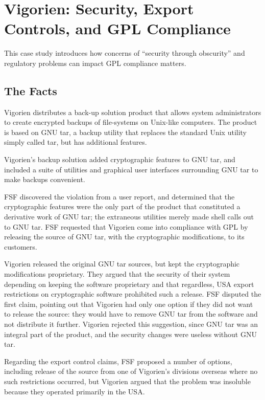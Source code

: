 {\begin{enumerate}
\end{enumerate}


\chapter{Vigorien: Security, Export Controls, and GPL Compliance}

This case study introduces how concerns of ``security through obscurity''
and regulatory problems can impact GPL compliance matters.

\section{The Facts}

Vigorien distributes a back-up solution product that allows system
administrators to create encrypted backups of file-systems on
Unix-like computers. The product is based on GNU tar, a backup utility
that replaces the standard Unix utility simply called tar, but has
additional features.

Vigorien's backup solution added cryptographic features to GNU tar, and
included a suite of utilities and graphical user interfaces surrounding
GNU tar to make backups convenient.

FSF discovered the violation from a user report, and determined that the
cryptographic features were the only part of the product that constituted
a derivative work of GNU tar; the extraneous utilities merely made
shell calls out to GNU tar. FSF requested that Vigorien come into
compliance with GPL by releasing the source of GNU tar, with the
cryptographic modifications, to its customers.

Vigorien released the original GNU tar sources, but kept the cryptographic
modifications proprietary. They argued that the security of their system
depending on keeping the software proprietary and that regardless, USA
export restrictions on cryptographic software prohibited such a release.
FSF disputed the first claim, pointing out that Vigorien had only one
option if they did not want to release the source: they would have to
remove GNU tar from the software and not distribute it further. Vigorien
rejected this suggestion, since GNU tar was an integral part of the
product, and the security changes were useless without GNU tar.

Regarding the export control claims, FSF proposed a number of options,
including release of the source from one of Vigorien's divisions overseas
where no such restrictions occurred, but Vigorien argued that the problem
was insoluble because they operated primarily in the USA\@.

}
